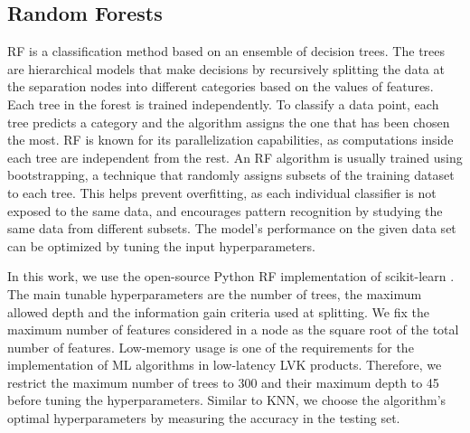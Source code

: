 \subsection*{Random Forests}

\ac{RF} is a classification method based on an ensemble of decision trees. The trees are hierarchical models that make decisions by recursively splitting the data at the separation nodes into different categories based on the values of features. Each tree in the forest is trained independently. To classify a data point, each tree predicts a category and the algorithm assigns the one that has been chosen the most. \ac{RF} is known for its parallelization capabilities, as computations inside each tree are independent from the rest. An \ac{RF} algorithm is usually trained using bootstrapping, a technique that randomly assigns subsets of the training dataset to each tree. This helps prevent overfitting, as each individual classifier is not exposed to the same data, and encourages pattern recognition by studying the same data from different subsets. The model's performance on the given data set can be optimized by tuning the input hyperparameters.

In this work, we use the open-source Python \ac{RF} implementation of scikit-learn \cite{Pedregosa:2011}. The main tunable hyperparameters are the number of trees, the maximum allowed depth and the information gain criteria used at splitting. We fix the maximum number of features considered in a node as the square root of the total number of features. Low-memory usage is one of the requirements for the implementation of \ac{ML} algorithms in low-latency \ac{LVK} products. Therefore, we restrict the maximum number of trees to 300 and their maximum depth to 45 before tuning the hyperparameters. Similar to \ac{KNN}, we choose the algorithm's optimal hyperparameters by measuring the accuracy in the testing set.

